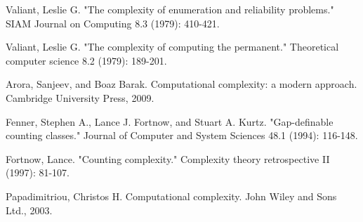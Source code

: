 \documentclass[paper=a4, fontsize=11pt]{scrartcl} %
\numberwithin{equation}{subsection}
\numberwithin{figure}{subsection}
\numberwithin{table}{subsection}
\numberwithin{definition}{subsection}
\numberwithin{theorem}{subsection}
\numberwithin{property}{subsection}
\numberwithin{proposition}{subsection}
\begin{document}
\pagebreak
\begin{thebibliography}{1}

 Valiant, Leslie G. "The complexity of enumeration and reliability problems." SIAM Journal on Computing 8.3 (1979): 410-421.

 Valiant, Leslie G. "The complexity of computing the permanent." Theoretical computer science 8.2 (1979): 189-201.

 Arora, Sanjeev, and Boaz Barak. Computational complexity: a modern approach. Cambridge University Press, 2009.

 Fenner, Stephen A., Lance J. Fortnow, and Stuart A. Kurtz. "Gap-definable counting classes." Journal of Computer and System Sciences 48.1 (1994): 116-148.

 Fortnow, Lance. "Counting complexity." Complexity theory retrospective II (1997): 81-107.

 Papadimitriou, Christos H. Computational complexity. John Wiley and Sons Ltd., 2003.

\end{thebibliography}
\end{document}
